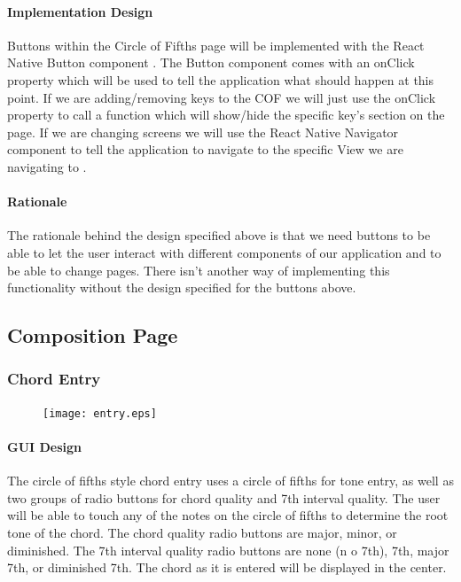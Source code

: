 \documentclass[onecolumn, draftclsnofoot,10pt, compsoc]{IEEEtran}
\begin{document}
\paragraph{Implementation Design}
Buttons within the Circle of Fifths page will be implemented with the React Native Button component \cite{react-button}.
The Button component comes with an onClick property which will be used to tell the application what should happen at this point.
If we are adding/removing keys to the COF we will just use the onClick property to call a function which will show/hide the specific key’s section on the page.
If we are changing screens we will use the React Native Navigator component to tell the application to navigate to the specific View we are navigating to \cite{react-navigators}.

\paragraph{Rationale}
The rationale behind the design specified above is that we need buttons to be able to let the user interact with different components of our application and to be able to change pages. 
There isn’t another way of implementing this functionality without the design specified for the buttons above.

\subsection{Composition Page}
\subsubsection{Chord Entry}

\begin{figure}[H]
    \centering
    \texttt{[image: entry.eps]}
\end{figure}

\paragraph{GUI Design}
The circle of fifths style chord entry uses a circle of fifths for tone entry, as well as two groups of radio buttons for chord quality and 7th interval quality. 
The user will be able to touch any of the notes on the circle of fifths to determine the root tone of the chord.
The chord quality radio buttons are major, minor, or diminished.
The 7th interval quality radio buttons are none (n o 7th), 7th, major 7th, or diminished 7th.
The chord as it is entered will be displayed in the center.
\end{document}
